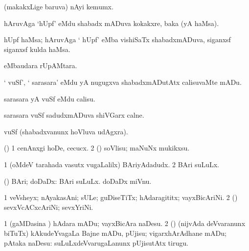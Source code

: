 {{{{{{\bentry
{}
  \gl{\nA}\bmng
(makakxLige baruva) nAyi kemumx. 
\emng
\eentry

\bentry
{}
 \gl{\nA}\bmng
hAruvAga `hUpf' eMdu shabadx mADuva kokakxre, baka (yA haMsa). 
\emng
\eentry

\bentry
{}
 \gl{\nA}\bmng
hUpf haMsa; hAruvAga ` hUpf' eMba vishiSaTx shabadxmADuva, siganxsf siganxsf kulda haMsa. 
\emng
\eentry

\bentry
{}
  \gl{\BAavayx}\bmng
{} eMbaudara rUpAMtara. 
\emng
\eentry

\bentry
{} 
\gl{\sakirx}
\expl{}
\bmng
` vuSf', ` sarasara' eMdu yA nugugxva shabadxmADutAtx calisuvaMte mADu. 
\emng

\noindent
\gl{\akirx}
\bmng
sarasara yA vuSf eMdu calisu. 
\emng
\eentry

\bentry
{} 
\gl{\nA}
\bmng
sarasara\eng{,} vuSf sadudxmADuva shiVGarx calne. 
\emng
\eentry

\bentry
{} 
\gl{\BAavayx}
\bmng
vuSf (shabadxvanunx hoVluva udAgxra). 
\emng
\eentry

\bentry
{} 
\gl{\sakirx}
\bmng
(\ashi) 
\bnum
\num{1} cenAnxgi hoDe, cecucx. 
\num{2} (\rUpa) soVlisu; maNuNx mukikxsu. 
\enum
\emng
\eentry

\bentry 
{}
  \gl{\nA}\bmng
\bnum
\num{1} (oMdeV tarahada vasutx \mo vugaLalilx) BAriyAdadudx. 
\num{2} BAri suLuLx. 
\enum
\emng
\eentry

\bentry
{}
  \gl{\gu}\bmng
(\ashi) BAri; doDaDx:  BAri suLuLx.  doDaDx miVnu. 
\emng
\eentry

\bentry
{} 
 \gl{\nA}\bmng
\bnum
\num{1} veVsheyx; nAyakasAni; sULe; guDiseTiTx; hAdaragititx; vayxBicAriNi. 
\num{2} (\hiV) sevxVcACxcAriNi; sevxYriNi. 
\enum
\emng
\eentry

\bentry
{} 
\gl{\akirx}
\bmng
\bnum
\num{1} (gaMDasina \vi) hAdara mADu; vayxBicAra naDesu. 
\num{2} (\pArxparx) (nijvAda deVvaranunx biTuTx) kAkudeYvagaLa Bajne mADu, pUjisu; vigarxhArAdhane mADu; pAtaka naDesu:  suLuLxdeVvarugaLanunx pUjisutAtx tirugu. 
\enum
\emng
\eentry

}}}}}}

